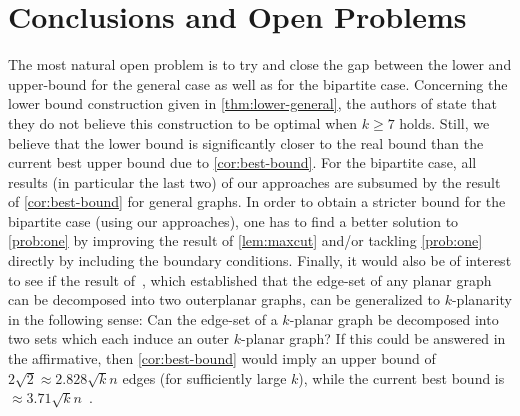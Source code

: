 \documentclass[nolineno,a4paper,USenglish,cleveref,autoref,thm-restate]
{socg}
\begin{document}
\section{Conclusions and Open Problems}\label{sec:open-problems}
The most natural open problem is to try and close the gap between the lower and upper-bound for the general case as well as for the bipartite case.
Concerning the lower bound construction given in \cref{thm:lower-general}, the authors of \cite{ábrego2024bookcrossingnumberscomplete} state that they do not believe this construction to be optimal when $k\geq 7$ holds. Still, we believe that the lower bound is significantly closer to the real bound than the current best upper bound due to \cref{cor:best-bound}.
For the bipartite case, all results (in particular the last two) of our approaches are subsumed by the result of \cref{cor:best-bound} for general graphs. In order to obtain a stricter bound for the bipartite case (using our approaches), one has to find a better solution to \cref{prob:one} by improving the result of \cref{lem:maxcut} and/or tackling \cref{prob:one} directly by including the boundary conditions.
Finally, it would also be of interest to see if the result of~\cite{DBLP:conf/stoc/Goncalves05}, which established that the edge-set of any planar graph can be decomposed into two outerplanar graphs, can be generalized to $k$-planarity in the following sense: Can the edge-set of a $k$-planar graph be decomposed into two sets which each induce an outer $k$-planar graph? If this could be answered in the affirmative, then \cref{cor:best-bound} would imply an upper bound of $2\sqrt{2}\approx2.828\sqrt{k}n$ edges (for sufficiently large $k$), while the current best bound is $\approx3.71\sqrt{k}n$~\cite{BestConstantCr}.












%
\end{document}
